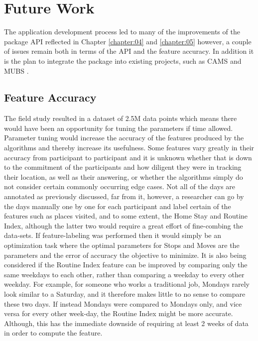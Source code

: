 \section{Future Work}
The application development process led to many of the improvements of the package API reflected in Chapter \ref{chapter:04} and \ref{chapter:05} however, a couple of issues remain both in terms of the API and the feature accuracy. In addition it is the plan to integrate the package into existing projects, such as CAMS \cite{CAMS} and MUBS \cite{mubs-rohani}.

\subsection{Feature Accuracy}
The field study resulted in a dataset of 2.5M data points which means there would have been an opportunity for tuning the parameters if time allowed. Parameter tuning would increase the accuracy of the features produced by the algorithms and thereby increase its usefulness. Some features vary greatly in their accuracy from participant to participant and it is unknown whether that is down to the commitment of the participants and how diligent they were in tracking their location, as well as their answering, or whether the algorithms simply do not consider certain commonly occurring edge cases. Not all of the days are annotated as previously discussed, far from it, however, a researcher can go by the days manually one by one for each participant and label certain of the features such as places visited, and to some extent, the Home Stay and Routine Index, although the latter two would require a great effort of fine-combing the data-sets. If feature-labeling was performed then it would simply be an optimization task where the optimal parameters for Stops and Moves are the parameters and the error of accuracy the objective to minimize. It is also being considered if the Routine Index feature can be improved by comparing only the same weekdays to each other, rather than comparing a weekday to every other weekday. For example, for someone who works a traditional job, Mondays rarely look similar to a Saturday, and it therefore makes little to no sense to compare these two days. If instead Mondays were compared to Mondays only, and vice versa for every other week-day, the Routine Index might be more accurate. Although, this has the immediate downside of requiring at least 2 weeks of data in order to compute the feature.

